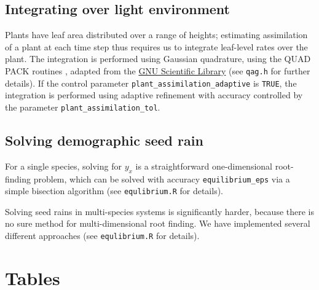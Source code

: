 \documentclass[10pt,twoside]{article}
\begin{document}
\subsection{Integrating over light
environment}\label{integrating-over-light-environment}

Plants have leaf area distributed over a range of heights; estimating
assimilation of a plant at each time step thus requires us to integrate
leaf-level rates over the plant. The integration is performed using
Gaussian quadrature, using the QUAD PACK routines \citep{Piessens-1983},
adapted from the \href{http://www.gnu.org/software/gsl/}{GNU Scientific
Library}\citep{Galassi-2009} (see \texttt{qag.h} for further details).
If the control parameter \texttt{plant\_assimilation\_adaptive} is \texttt{TRUE},
the integration is performed using adaptive refinement with accuracy
controlled by the parameter \texttt{plant\_assimilation\_tol}.

\subsection{Solving demographic seed
rain}\label{solving-demographic-seed-rain}

For a single species, solving for \(y_x\) is a straightforward
one-dimensional root-finding problem, which can be solved with accuracy
\texttt{equilibrium\_eps} via a simple bisection algorithm (see 
\texttt{equlibrium.R} for details). 

Solving seed rains in multi-species systems is significantly harder,
because there is no sure method for multi-dimensional root finding. We
have implemented several different approaches (see 
\texttt{equlibrium.R} for details).


\clearpage

\section{Tables}\label{tables}
\end{document}

